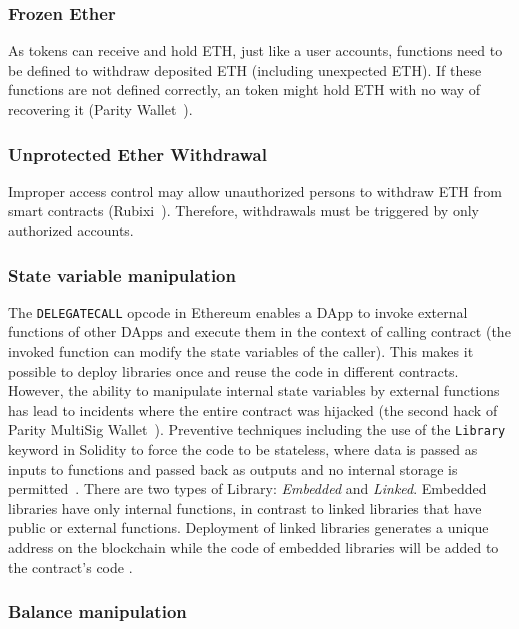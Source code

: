 \subsubsection{Frozen Ether}

As \erc tokens can receive and hold ETH, just like a user accounts, functions need to be defined to withdraw deposited ETH (including unexpected ETH). If these functions are not defined correctly, an \erc token might hold ETH with no way of recovering it (\cf Parity Wallet~\cite{ParityWalletHack}).

\subsubsection{Unprotected Ether Withdrawal}

Improper access control may allow unauthorized persons to withdraw ETH from smart contracts (\cf Rubixi~\cite{Rubixi}). Therefore, withdrawals must be triggered by only authorized accounts.

\subsubsection{State variable manipulation}

The \texttt{DELEGATECALL} opcode in Ethereum enables a DApp to invoke external functions of other DApps and execute them in the context of calling contract (\ie the invoked function can modify the state variables of the caller). This makes it possible to deploy libraries once and reuse the code in different contracts. However, the ability to manipulate internal state variables by external functions has lead to incidents where the entire contract was hijacked (\cf the second hack of Parity MultiSig Wallet~\cite{ParitySecondHack}). Preventive techniques including the use of the \texttt{Library} keyword in Solidity to force the code to be stateless, where data is passed as inputs to functions and passed back as outputs and no internal storage is permitted~\cite{LIB1}. There are two types of Library: \textit{Embedded} and \textit{Linked}. Embedded libraries have only internal functions, in contrast to linked libraries that have public or external functions. Deployment of linked libraries generates a unique address on the blockchain while the code of embedded libraries will be added to the contract's code \cite{LIB2}.

\subsubsection{Balance manipulation}\label{sec:unexpected}

